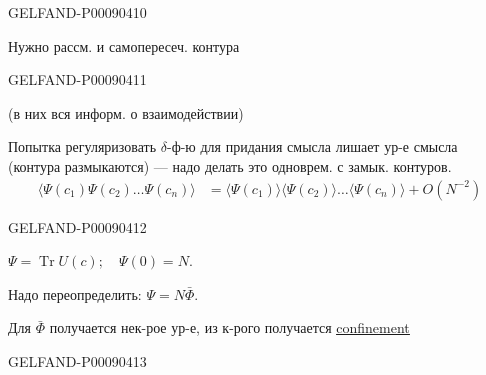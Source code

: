 \begin{GelfandAdjacentEvidence}{GELFAND-P000904}{10}

Нужно рассм. и самопересеч. контура
\end{GelfandAdjacentEvidence}
\begin{GelfandAdjacentEvidence}{GELFAND-P000904}{11}


(в них вся информ. о взаимодействии)

Попытка регуляризовать $\delta$-ф-ю для придания смысла лишает ур-е смысла (контура размыкаются) --- надо делать это одноврем. с замык. контуров.
\begin{equation*}
\begin{aligned}
\langle\Psi(c_1)\Psi(c_2)\ldots\Psi(c_n)\rangle
&=\langle\Psi(c_1)\rangle\langle\Psi(c_2)\rangle\ldots
\langle\Psi(c_n)\rangle+O(N^{-2})
\end{aligned}
\tag{35}
\end{equation*}
\end{GelfandAdjacentEvidence}
\begin{GelfandAdjacentEvidence}{GELFAND-P000904}{12}


$\Psi=\operatorname{Tr}U(c);\quad\Psi(0)=N.$

Надо переопределить: $\Psi=N\bar\Phi$.

Для $\bar\Phi$ получается нек-рое ур-е, из к-рого получается \underline{\underline{confinement}}

\end{GelfandAdjacentEvidence}
\begin{GelfandAdjacentEvidence}{GELFAND-P000904}{13}

\end{GelfandAdjacentEvidence}



